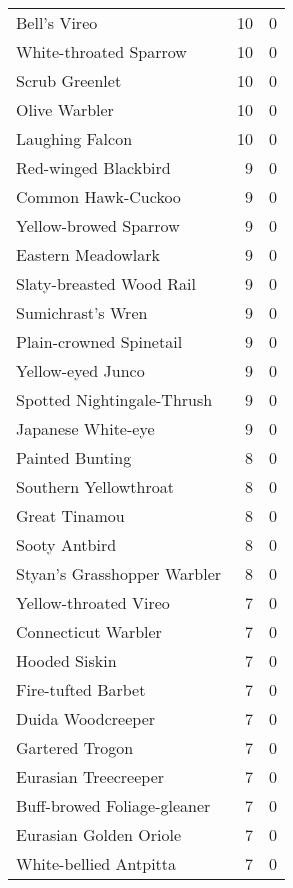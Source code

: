 \begin{longtable}{l r r}
Bell's Vireo                    &10   &0     \\
White-throated Sparrow          &10   &0     \\
Scrub Greenlet                  &10   &0     \\
Olive Warbler                   &10   &0     \\
Laughing Falcon                 &10   &0     \\
Red-winged Blackbird            &9    &0     \\
Common Hawk-Cuckoo              &9    &0     \\
Yellow-browed Sparrow           &9    &0     \\
Eastern Meadowlark              &9    &0     \\
Slaty-breasted Wood Rail        &9    &0     \\
Sumichrast's Wren               &9    &0     \\
Plain-crowned Spinetail         &9    &0     \\
Yellow-eyed Junco               &9    &0     \\
Spotted Nightingale-Thrush      &9    &0     \\
Japanese White-eye              &9    &0     \\
Painted Bunting                 &8    &0     \\
Southern Yellowthroat           &8    &0     \\
Great Tinamou                   &8    &0     \\
Sooty Antbird                   &8    &0     \\
Styan's Grasshopper Warbler     &8    &0     \\
Yellow-throated Vireo           &7    &0     \\
Connecticut Warbler             &7    &0     \\
Hooded Siskin                   &7    &0     \\
Fire-tufted Barbet              &7    &0     \\
Duida Woodcreeper               &7    &0     \\
Gartered Trogon                 &7    &0     \\
Eurasian Treecreeper            &7    &0     \\
Buff-browed Foliage-gleaner     &7    &0     \\
Eurasian Golden Oriole          &7    &0     \\
White-bellied Antpitta          &7    &0     \\

\end{longtable}
